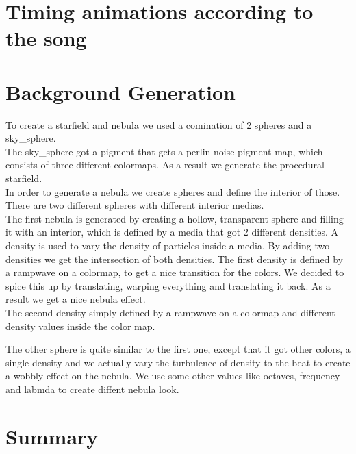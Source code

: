 \documentclass[a4paper, 12pt]{scrartcl}
\begin{document}
    \section{Timing animations according to the song}

    \section{Background Generation}
    To create a starfield and nebula we used a comination of 2 spheres and a sky\_sphere. \\ 
    The sky\_sphere got a pigment that gets a perlin noise pigment map, which consists of three different colormaps. As a result we generate the procedural starfield. \\
    In order to generate a nebula we create spheres and define the interior of those. There are two different spheres with different interior medias. \\
    The first nebula is generated by creating a hollow, transparent sphere and filling it with an interior, which is defined by a media that got 2 different densities. A density is used to vary the density of particles inside a media.
    By adding two densities we get the intersection of both densities. The first density is defined by a rampwave on a colormap, to get a nice transition for the colors. We decided to spice this up by translating, warping everything and translating it back. As a result we get a nice nebula effect. \\
    The second density simply defined by a rampwave on a colormap and different density values inside the color map.

    The other sphere is quite similar to the first one, except that it got other colors, a single density and we actually vary the turbulence of density to the beat to create a wobbly effect on the nebula. 
    We use some other values like octaves, frequency and labmda to create diffent nebula look.

    \section{Summary}
\end{document}
